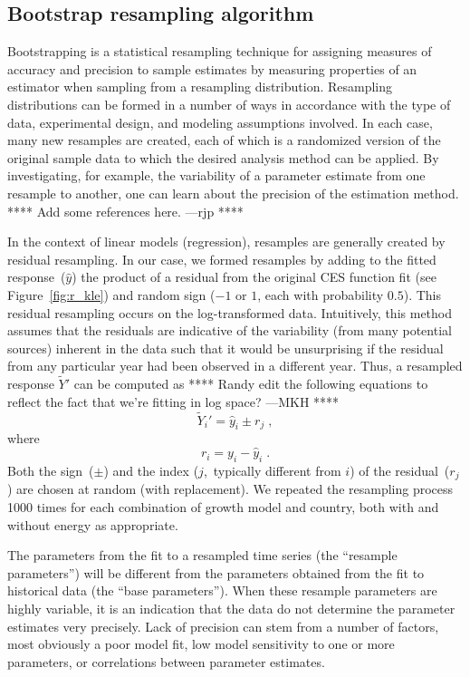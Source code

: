 \documentclass[preprint,10pt,3p]{elsarticle}\usepackage[]{graphicx}\usepackage[]{color}
\begin{document}
\subsection{Bootstrap resampling algorithm}
\label{sec:appendix_resampling}

Bootstrapping is a statistical resampling technique for assigning
measures of accuracy and precision to sample estimates by measuring
properties of an estimator when sampling from a resampling
distribution.
Resampling distributions can be formed in a number of
ways in accordance with the type of data, experimental design,
and modeling assumptions involved.
In each case, many new resamples
are created, each of which is a randomized version of the original sample data to
which the desired analysis method can be applied.
By investigating, for example,
the variability of a parameter estimate from one resample to another,
one can learn about the precision of the estimation method.
**** Add some references here. ---rjp ****

In the context of linear models (regression),
resamples are generally created
by residual resampling.
In our case, we formed resamples by adding to the fitted
response~($\hat{y}$) the product of a residual from the original CES function fit
(see Figure~\ref{fig:r_kle}) and
random sign ($-1$ or $1$, each with probability $0.5$).
This residual resampling occurs on the
log-transformed data.
Intuitively, this method assumes that the residuals are indicative of
the variability (from many potential sources) inherent in the data such that
it would be unsurprising if the residual from
any particular year had been observed in a different year.
Thus, a resampled response $\tilde Y'$ can be computed as
**** Randy edit the following equations to reflect the fact that
we're fitting in log space? ---MKH ****
%
\begin{equation}
  \tilde Y_i' = \hat y_i \pm r_j \; ,
\end{equation}
%
where
%
\begin{equation}
  r_i = y_i - \hat y_i \; .
\end{equation}
%
Both the sign~($\pm$) and the index
($j$,~typically different from $i$)
of the residual~($r_j$)
are chosen at random (with replacement).
We repeated the resampling process 1000 times for each
combination of growth model and country,
both with and without energy as appropriate.

The parameters from the fit to a resampled time series
(the ``resample parameters'') will be different from the parameters
obtained from the fit to historical data (the ``base parameters'').
When these resample parameters are highly variable,
it is an indication
that the data do not determine the parameter estimates very precisely.
Lack of precision can stem from a number of factors, most obviously
a poor model fit,
low model sensitivity to one or more parameters, or
correlations between parameter estimates.
\end{document}
